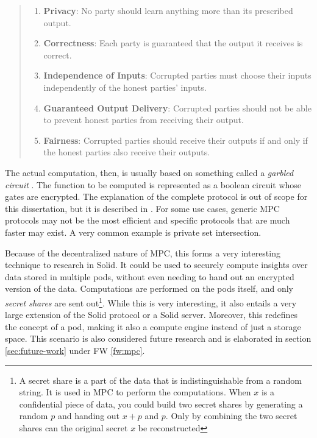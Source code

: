 \begin{quote}{\citet[p.2]{secure-mpc}}
\begin{enumerate}
    \item \textbf{Privacy}: No party should learn anything more than its prescribed output.
    \item \textbf{Correctness}: Each party is guaranteed that the output it receives is correct.
    \item \textbf{Independence of Inputs}: Corrupted parties must choose their inputs independently of the honest parties' inputs.
    \item \textbf{Guaranteed Output Delivery}: Corrupted parties should not be able to prevent honest parties from receiving their output.
    \item \textbf{Fairness}: Corrupted parties should receive their outputs if and only if the honest parties also receive their outputs.
\end{enumerate}
\end{quote}
The actual computation, then, is usually based on something called a \textit{garbled circuit} \citep{garbled-circuit}. The function to be computed is represented as a boolean circuit whose gates are encrypted. The explanation of the complete protocol is out of scope for this dissertation, but it is described in \citet{secure-mpc, pragmatic-mpc}. For some use cases, generic \gls{MPC} protocols may not be the most efficient and specific protocols that are much faster may exist. A very common example is private set intersection.

Because of the decentralized nature of \gls{MPC}, this forms a very interesting technique to research in Solid. It could be used to securely compute insights over data stored in multiple pods, without even needing to hand out an encrypted version of the data. Computations are performed on the pods itself, and only \textit{secret shares} are sent out\footnote{A secret share is a part of the data that is indistinguishable from a random string. It is used in \gls{MPC} to perform the computations. When $x$ is a confidential piece of data, you could build two secret shares by generating a random $p$ and handing out $x + p$ and $p$. Only by combining the two secret shares can the original secret $x$ be reconstructed}. While this is very interesting, it also entails a very large extension of the Solid protocol or a Solid server. Moreover, this redefines the concept of a pod, making it also a compute engine instead of just a storage space. This scenario is also considered future research and is elaborated in section \ref{sec:future-work} under FW \ref{fw:mpc}.

